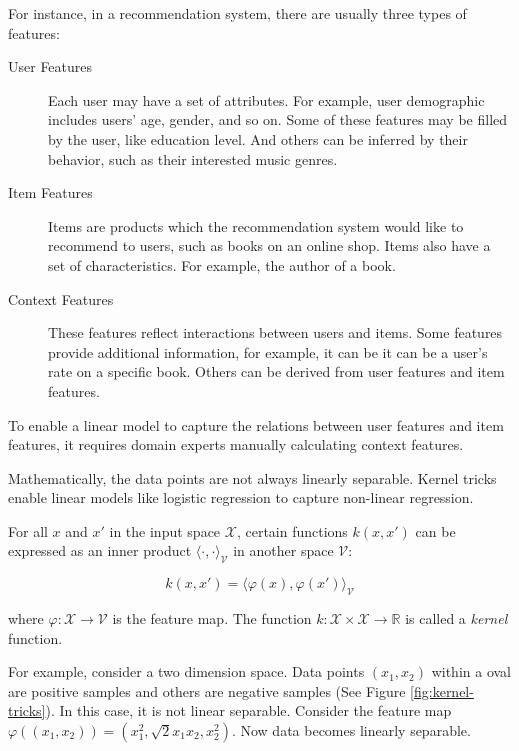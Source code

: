         For instance, in a recommendation system, there are usually three types of features: \cite{Ricci2011}

        \begin{description}
            \item[User Features] Each user may have a set of attributes.
                For example, user demographic includes users' age, gender, and so on.
                Some of these features may be filled by the user, like education level.
                And others can be inferred by their behavior, such as their interested music genres.
            \item[Item Features] Items are products which the recommendation system would like to recommend to users,
                such as books on an online shop.
                Items also have a set of characteristics.
                For example, the author of a book.
            \item[Context Features] These features reflect interactions between users and items.
                Some features provide additional information,
                for example, it can be it can be a user's rate on a specific book.
                Others can be derived from user features and item features.
        \end{description}

        To enable a linear model to capture the relations between user features and item features,
        it requires domain experts manually calculating context features.

        Mathematically, the data points are not always linearly separable.
        Kernel tricks enable linear models like logistic regression to capture non-linear regression.

        For all $x$ and $x'$ in the input space $\mathcal{X}$,
        certain functions $k(x, x')$ can be expressed as an inner product $\langle\cdot,\cdot\rangle_{\mathcal{V}}$
        in another space $\mathcal{V}$:

        \[
        k(x, x') = \langle \varphi(x), \varphi(x') \rangle_{\mathcal{V}}
        \]

        where $\varphi: \mathcal{X} \rightarrow \mathcal{V}$ is the feature map.
        The function $k: \mathcal{X} \times \mathcal{X} \rightarrow \mathbb{R}$ is called a \emph{kernel} function.

        For example, consider a two dimension space.
        Data points $(x_1, x_2)$ within a oval are positive samples and others are negative samples
        (See Figure \ref{fig:kernel-tricks}).
        In this case, it is not linear separable.
        Consider the feature map $\varphi((x_1, x_2)) = (x_1^2, \sqrt{2}x_1x_2, x_2^2)$.
        Now data becomes linearly separable. \cite{Rai2011}

